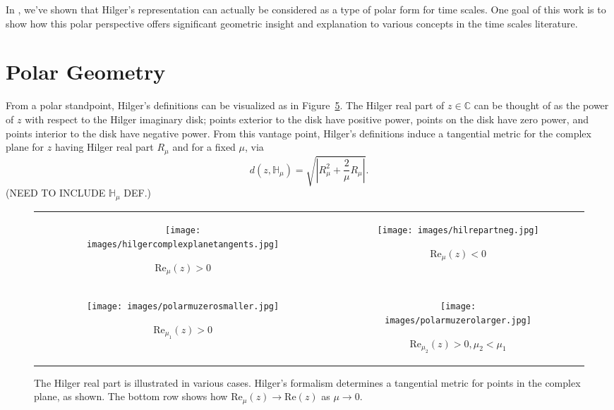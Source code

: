 \documentclass[reqno]{amsart}
\theoremstyle{plain}
\theoremstyle{definition}
\numberwithin{theorem}{section}
\numberwithin{definition}{section}
\numberwithin{prop}{section}
\numberwithin{example}{section}
\newcommand{\G}{\ensuremath{\mathbb{H}}}
\newcommand{\C}{\ensuremath{\mathbb{C}}}
\begin{document}
In \cite{JaDaPo}, we've shown that Hilger's representation can actually be considered as a type of polar form for time scales.  One goal of this work is to show how this polar perspective offers significant geometric insight and explanation to various concepts in the time scales literature.  

\section{Polar Geometry}
From a polar standpoint, Hilger's definitions can be visualized as in Figure~\ref{fig:hilgerpolar}.  The Hilger real part of $z \in \C$ can be thought of as the power of $z$ with respect to the Hilger imaginary disk; points exterior to the disk have positive power, points on the disk have zero power, and points interior to the disk have negative power.  From this vantage point, Hilger's definitions induce a tangential metric for the complex plane for $z$ having Hilger real part  $R_\mu$ and for a fixed $\mu$, via $$d(z,\G_\mu)=\sqrt{\left|R_\mu^2+\frac{2}{\mu}R_\mu\right|}.$$ (NEED TO INCLUDE $\G_\mu$ DEF.)

\begin{figure}
\centering
\begin{tabular}{cc}
\begin{subfigure}{.5\textwidth}\centering\texttt{[image: images/hilgercomplexplanetangents.jpg]}\caption{$\text{Re}_\mu(z)>0$}\label{fig:hilrealpos}\end{subfigure}&
\begin{subfigure}{.5\textwidth}\centering\texttt{[image: images/hilrepartneg.jpg]}\caption{$\text{Re}_\mu(z)<0$}\label{fig:hilrealneg}\end{subfigure}\\
\newline
\begin{subfigure}{.5\textwidth}\centering\texttt{[image: images/polarmuzerosmaller.jpg]} \caption{$\text{Re}_{\mu_1}(z)>0$}\label{fig:hilzerosmall}\end{subfigure}&
\begin{subfigure}{.5\textwidth}\centering\texttt{[image: images/polarmuzerolarger.jpg]} \caption{$\text{Re}_{\mu_2}(z)>0, \mu_2<\mu_1$}\label{fig:hilzerolarge}\end{subfigure} \\
\end{tabular}
\caption{The Hilger real part is illustrated in various cases.  Hilger's formalism determines a tangential metric for points in the complex plane, as shown.  The bottom row shows how $\text{Re}_\mu(z)\to \text{Re}(z)$ as $\mu \to 0$.}
\label{fig:hilgerpolar}
\end{figure}
\end{document}
